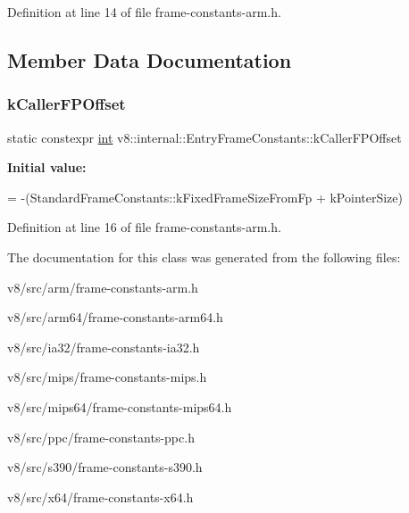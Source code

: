 Definition at line 14 of file frame-\/constants-\/arm.\+h.



\subsection{Member Data Documentation}
\mbox{\label{classv8_1_1internal_1_1EntryFrameConstants_a68b7a7b14ac15e126981bb5f8cac2d74}} 
\subsubsection{\texorpdfstring{k\+Caller\+F\+P\+Offset}{kCallerFPOffset}}
{\footnotesize\ttfamily static constexpr \mbox{\hyperlink{classint}{int}} v8\+::internal\+::\+Entry\+Frame\+Constants\+::k\+Caller\+F\+P\+Offset\hspace{0.3cm}{\ttfamily [static]}}

{\bfseries Initial value\+:}
\begin{DoxyCode}
=
      -(StandardFrameConstants::kFixedFrameSizeFromFp + kPointerSize)
\end{DoxyCode}


Definition at line 16 of file frame-\/constants-\/arm.\+h.



The documentation for this class was generated from the following files\+:\begin{DoxyCompactItemize}
\item 
v8/src/arm/frame-\/constants-\/arm.\+h\item 
v8/src/arm64/frame-\/constants-\/arm64.\+h\item 
v8/src/ia32/frame-\/constants-\/ia32.\+h\item 
v8/src/mips/frame-\/constants-\/mips.\+h\item 
v8/src/mips64/frame-\/constants-\/mips64.\+h\item 
v8/src/ppc/frame-\/constants-\/ppc.\+h\item 
v8/src/s390/frame-\/constants-\/s390.\+h\item 
v8/src/x64/frame-\/constants-\/x64.\+h\end{DoxyCompactItemize}
